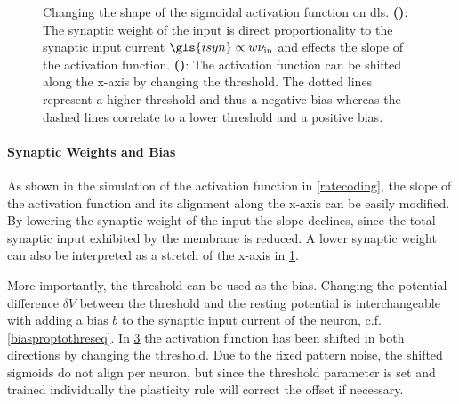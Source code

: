 \begin{figure}[tb!]
	\begin{subfigure}[c]{0.5\textwidth}
		\centering
		\caption{}
		
		\label{dlsactivationfunctionweight}
	\end{subfigure}	
	\begin{subfigure}[c]{0.5\textwidth}
		\centering
		\caption{}
		
		\label{dlsactivationfunctionbias}
	\end{subfigure}
	\caption[Changing the shape of the sigmoidal activation function on \gls{dls}.]{Changing the shape of the sigmoidal activation function on \gls{dls}. \textbf{()}: The synaptic weight of the input is direct proportionality to the synaptic input current $\gls{isyn} \propto w \nu_\text{in}$ and effects the slope of the activation function. \textbf{()}: The activation function can be shifted along the x-axis by changing the threshold. The dotted lines represent a higher threshold and thus a negative bias whereas the dashed lines correlate to a lower threshold and a positive bias.}
\end{figure}

\paragraph{Synaptic Weights and Bias} As shown in the simulation of the activation function in \cref{ratecoding}, the slope of the activation function and its alignment along the x-axis can be easily modified. By lowering the synaptic weight of the input the slope declines, since the total synaptic input exhibited by the membrane is reduced. A lower synaptic weight can also be interpreted as a stretch of the x-axis in \cref{dlsactivationfunctionweight}.

More importantly, the threshold can be used as the bias. Changing the potential difference $\delta V$ between the threshold and the resting potential is interchangeable with adding a bias $b$ to the synaptic input current of the neuron, c.f. \cref{biasproptothreseq}. In \cref{dlsactivationfunctionbias} the activation function has been shifted in both directions by changing the threshold. Due to the fixed pattern noise, the shifted sigmoids do not align per neuron, but since the threshold parameter is set and trained individually the plasticity rule will correct the offset if necessary.




